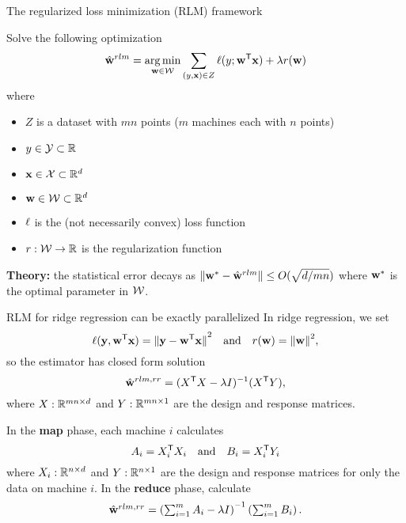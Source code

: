 \begin{frame}{The regularized loss minimization (RLM) framework}

Solve the following optimization
\begin{equation}
\hat{\mathbf{w}}^{rlm} = \operatorname*{arg\,min}_{\mathbf{w}\in{\mathcal{W}}} \sum_{(y,\mathbf{x})\in Z} \ell(y;{\mathbf{w}}^{\mathsf{T}}\mathbf{x}) + \lambda r(\mathbf{w})
\end{equation}
where
\begin{itemize}
\item $Z$ is a dataset with $mn$ points ($m$ machines each with $n$ points)
\item $y\in\mathcal{Y}\subset\mathbb R$
\item $\mathbf{x}\in\mathcal{X}\subset\mathbb R^d$
\item $\mathbf{w}\in{\mathcal{W}}\subset\mathbb R^d$
\item $\ell$ is the (not necessarily convex) loss function
\item $r : {\mathcal{W}}\to\mathbb R$ is the regularization function
\end{itemize}

\vspace{0.15in}
\textbf{Theory:} the statistical error decays as ${\lVert {{\mathbf{w}^{*}}-\hat{\mathbf{w}}^{rlm}} \rVert} \le O(\sqrt{d/mn})$ where ${\mathbf{w}^{*}}$ is the optimal parameter in ${\mathcal{W}}$.
\end{frame}


\begin{frame}{RLM for ridge regression can be exactly parallelized}
In ridge regression, we set
\begin{equation}
\ell(\mathbf{y},{\mathbf{w}}^{\mathsf{T}}\mathbf{x}) = {\lVert {\mathbf{y}-\ensuremath{{\mathbf{w}}^{\mathsf{T}}}\mathbf{x}} \rVert}^2 
~~~ \text{and} ~~~
r(\mathbf{w}) = {\lVert {\mathbf{w}} \rVert}^2,
\end{equation}
so the estimator has closed form solution
\begin{equation}
\hat{\mathbf{w}}^{rlm,rr} = ({X}^{\mathsf{T}} X - \lambda I)^{-1}({X}^{\mathsf{T}} Y),
\end{equation}
where $X : \mathbb{R}^{mn\times d}$ and $Y : \mathbb{R}^{mn\times 1}$ are the design and response matrices.

\pause
\hrulefill
\vspace{0.1in}

In the \textbf{map} phase, each machine $i$ calculates
\begin{equation}
A_i = {X}^{\mathsf{T}}_i X_i
~~~\text{and}~~~
B_i = {X}^{\mathsf{T}}_i Y_i
\end{equation}
where $X_i : \mathbb{R}^{n\times d}$ and $Y : \mathbb{R}^{n\times 1}$ are the design and response matrices for only the data on machine $i$.
In the \textbf{reduce} phase, calculate
\begin{equation}
\textstyle
\hat{\mathbf{w}}^{rlm,rr} = \left(\sum_{i=1}^m A_i - \lambda I\right)^{-1}\left(\sum_{i=1}^m B_i\right).
\end{equation}
\end{frame}
